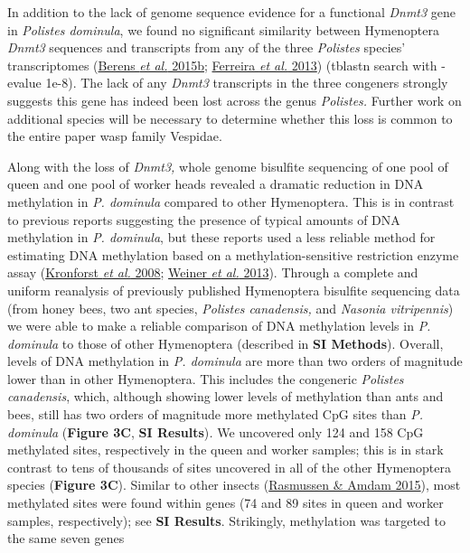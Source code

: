 \documentclass[]{article}
\begin{document}
In addition to the lack of genome sequence evidence for a functional
\emph{Dnmt3} gene in \emph{Polistes dominula}, we found no significant
similarity between Hymenoptera \emph{Dnmt3} sequences and transcripts
from any of the three \emph{Polistes} species' transcriptomes
(\protect\hyperlink{ux5fENREFux5f3}{Berens \emph{et al.} 2015b};
\protect\hyperlink{ux5fENREFux5f10}{Ferreira \emph{et al.} 2013})
(tblastn search with -evalue 1e-8). The lack of any \emph{Dnmt3}
transcripts in the three congeners strongly suggests this gene has
indeed been lost across the genus \emph{Polistes.} Further work on
additional species will be necessary to determine whether this loss is
common to the entire paper wasp family Vespidae.

Along with the loss of \emph{Dnmt3,} whole genome bisulfite sequencing
of one pool of queen and one pool of worker heads revealed a dramatic
reduction in DNA methylation in \emph{P. dominula} compared to other
Hymenoptera. This is in contrast to previous reports suggesting the
presence of typical amounts of DNA methylation in \emph{P. dominula},
but these reports used a less reliable method for estimating DNA
methylation based on a methylation-sensitive restriction enzyme assay
(\protect\hyperlink{ux5fENREFux5f26}{Kronforst \emph{et al.} 2008};
\protect\hyperlink{ux5fENREFux5f67}{Weiner \emph{et al.} 2013}). Through
a complete and uniform reanalysis of previously published Hymenoptera
bisulfite sequencing data (from honey bees, two ant species,
\emph{Polistes canadensis,} and \emph{Nasonia vitripennis}) we were able
to make a reliable comparison of DNA methylation levels in \emph{P.
dominula} to those of other Hymenoptera (described in \textbf{SI
Methods}). Overall, levels of DNA methylation in \emph{P. dominula} are
more than two orders of magnitude lower than in other Hymenoptera. This
includes the congeneric \emph{Polistes canadensis}, which, although
showing lower levels of methylation than ants and bees, still has two
orders of magnitude more methylated CpG sites than \emph{P. dominula}
(\textbf{Figure 3C}, \textbf{SI Results})\emph{.} We uncovered only 124
and 158 CpG methylated sites, respectively in the queen and worker
samples; this is in stark contrast to tens of thousands of sites
uncovered in all of the other Hymenoptera species (\textbf{Figure 3C}).
Similar to other insects (\protect\hyperlink{ux5fENREFux5f45}{Rasmussen
\& Amdam 2015}), most methylated sites were found within genes (74 and
89 sites in queen and worker samples, respectively); see \textbf{SI
Results}. Strikingly, methylation was targeted to the same seven genes
\end{document}

